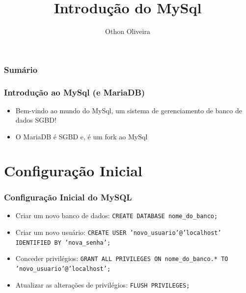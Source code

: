 \documentclass[13pt, xcolor={dvipsnames,svgnames}, portuguese]{beamer}
\author{Othon Oliveira}
\title{Introdução do MySql}
\institute{SENAC - PROA}
\date{}
\begin{document}
\begin{frame}
\titlepage
\end{frame}

\newcommand{\capa}{
    \begin{tikzpicture}[remember picture,overlay]
        \node at (current page.south west)
            {\begin{tikzpicture}[remember picture, overlay]
                \fill[shading=radial,top color=orange,bottom color=orange,middle color=yellow] (0,0) rectangle (\paperwidth,\paperheight);
            \end{tikzpicture}
          };
    \end{tikzpicture}
}


\begin{frame}\frametitle{Sumário}
\tableofcontents
\end{frame}

\begin{frame}
  \frametitle{Introdução ao MySql (e MariaDB)}
  \begin{itemize}
  \item Bem-vindo ao mundo do MySql, um sistema de gerenciamento de banco de dados SGBD!
  \pause
  \item   O MariaDB é SGBD e, é um fork ao MySql
  \end{itemize} 
\end{frame}



\section{Configuração Inicial}
\begin{frame}
  \frametitle{Configuração Inicial do MySQL}
  \begin{itemize}
    \item Criar um novo banco de dados: \texttt{CREATE DATABASE nome\_do\_banco;}
    \item Criar um novo usuário: \texttt{CREATE USER 'novo\_usuario'@'localhost' IDENTIFIED BY 'nova\_senha';}
    \item Conceder privilégios: \texttt{GRANT ALL PRIVILEGES ON nome\_do\_banco.* TO 'novo\_usuario'@'localhost';}
    \item Atualizar as alterações de privilégios: \texttt{FLUSH PRIVILEGES;}
  \end{itemize}
\end{frame}
\end{document}
